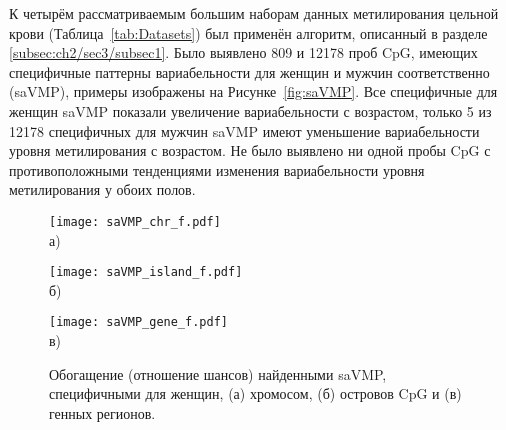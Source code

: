 К четырём рассматриваемым большим наборам данных метилирования цельной крови (Таблица~\ref{tab:Datasets}) был применён алгоритм, описанный в разделе \ref{subsec:ch2/sec3/subsec1}. Было выявлено 809 и 12178 проб CpG, имеющих специфичные паттерны вариабельности для женщин и мужчин соответственно (saVMP), примеры изображены на Рисунке~\ref{fig:saVMP}. Все специфичные для женщин saVMP показали увеличение вариабельности с возрастом, только 5 из 12178 специфичных для мужчин saVMP имеют уменьшение вариабельности уровня метилирования с возрастом. Не было выявлено ни одной пробы CpG с противоположными тенденциями изменения вариабельности уровня метилирования у обоих полов. 

\begin{figure}[ht]
	\begin{minipage}[b][][b]{0.49\linewidth}\centering
		\texttt{[image: saVMP\_chr\_f.pdf]} \\ а)
	\end{minipage}
	\hfill
	\begin{minipage}[b][][b]{0.49\linewidth}\centering
		\texttt{[image: saVMP\_island\_f.pdf]} \\ б)
	\end{minipage}
	\begin{minipage}[b][][b]{0.99\linewidth}\centering
		\texttt{[image: saVMP\_gene\_f.pdf]} \\ в)
	\end{minipage}
	\caption{Обогащение (отношение шансов) найденными saVMP, специфичными для женщин, (а) хромосом, (б) островов CpG и (в) генных регионов.}
	\label{fig:saVMP_Fisher_f}
\end{figure}

